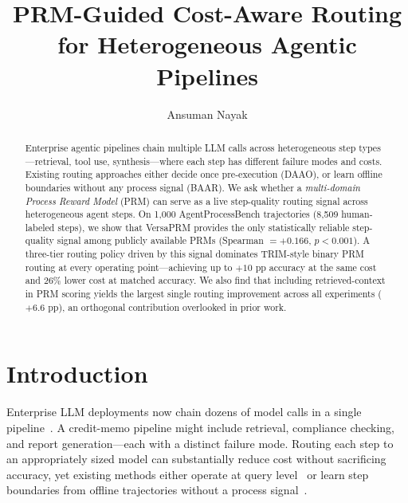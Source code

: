 \documentclass[sigconf,natbib=false]{acmart}
\begin{document}
\title{PRM-Guided Cost-Aware Routing for Heterogeneous Agentic Pipelines}

\author{Ansuman Nayak}

\begin{abstract}
Enterprise agentic pipelines chain multiple LLM calls across heterogeneous step
types---retrieval, tool use, synthesis---where each step has different failure
modes and costs.  Existing routing approaches either decide once pre-execution
(DAAO), or learn offline boundaries without any process signal (BAAR).  We ask
whether a \emph{multi-domain Process Reward Model} (PRM) can serve as a live
step-quality routing signal across heterogeneous agent steps.  On 1,000
AgentProcessBench trajectories (8,509 human-labeled steps), we show that
VersaPRM provides the only statistically reliable step-quality signal among
publicly available PRMs (Spearman $= +0.166$, $p < 0.001$). A three-tier
routing policy driven by this signal dominates TRIM-style binary PRM routing
at every operating point---achieving up to $+10$ pp accuracy at the same cost
and $26\%$ lower cost at matched accuracy.  We also find that including
retrieved-context in PRM scoring yields the largest single routing improvement
across all experiments ($+6.6$ pp), an orthogonal contribution overlooked in
prior work.
\end{abstract}


\maketitle

\section{Introduction}

Enterprise LLM deployments now chain dozens of model calls in a single
pipeline~\cite{jpmorgan2026}.  A credit-memo pipeline might include retrieval,
compliance checking, and report generation---each with a distinct failure
mode.  Routing each step to an appropriately sized model can substantially
reduce cost without sacrificing accuracy, yet existing methods either operate
at query level~\cite{daao2025} or learn step boundaries from offline
trajectories without a process signal~\cite{baar2026}.
\end{document}
